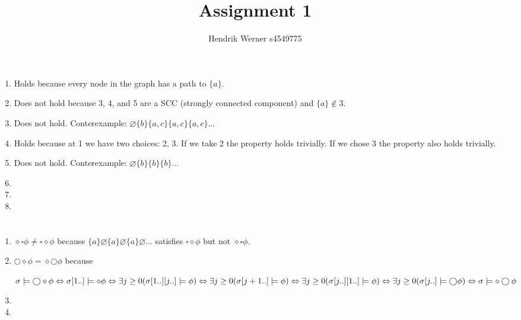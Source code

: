 \documentclass[12pt, a4paper]{article}
\title{Assignment 1}
\author{Hendrik Werner s4549775}
\begin{document}
\maketitle

\section{} %
\begin{enumerate}[a]
	\item %
	Holds because every node in the graph has a path to $\{a\}$.
	\item %
	Does not hold because 3, 4, and 5 are a SCC (strongly connected component) and $\{a\} \not \in 3$.
	\item %
	Does not hold. Conterexample: $\varnothing \{b\} \{a, c\} \{a, c\} \{a, c\} \dots$
	\item %
	Holds because at 1 we have two choices: 2, 3. If we take 2 the property holds trivially. If we chose 3 the property also holds trivially.
	\item %
	Does not hold. Conterexample: $\varnothing \{b\} \{b\} \{b\} \dots$
	\item %
	\item %
	\item %
\end{enumerate}

\section{} %
\begin{enumerate}[a]
	\item %
	$\diamond \square \phi \neq \square \diamond \phi$ because $\{a\} \varnothing \{a\} \varnothing \{a\} \varnothing \dots$ satisfies $\square \diamond \phi$ but not $\diamond \square \phi$.
	\item %
	$\bigcirc \diamond \phi = \diamond \bigcirc \phi$ because

	$\sigma \models \bigcirc \diamond \phi\\
	\Leftrightarrow \sigma[1..] \models \diamond \phi\\
	\Leftrightarrow \exists j \geq 0 (\sigma[1..][j..] \models \phi)\\
	\Leftrightarrow \exists j \geq 0 (\sigma[j+1..] \models \phi)\\
	\Leftrightarrow \exists j \geq 0 (\sigma[j..][1..] \models \phi)\\
	\Leftrightarrow \exists j \geq 0 (\sigma[j..] \models \bigcirc \phi)\\
	\Leftrightarrow \sigma \models \diamond \bigcirc \phi$
	\item %
	\item %
\end{enumerate}
\end{document}
